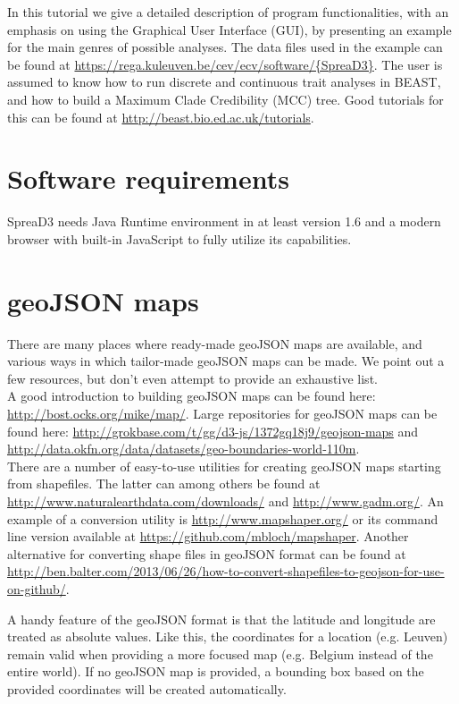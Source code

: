 \documentclass[english]{paper}
\def \spreadname {SpreaD3}
\begin{document}
\par
In this tutorial we give a detailed description of program functionalities, with an emphasis on using the Graphical User Interface (GUI), by presenting an example for the main genres of possible analyses. %
The data files used in the example can be found at  \url{https://rega.kuleuven.be/cev/ecv/software/{\spreadname}}.
The user is assumed to know how to run discrete and continuous trait analyses in BEAST, and how to build a Maximum Clade Credibility (MCC) tree. 
Good tutorials for this can be found at \url{http://beast.bio.ed.ac.uk/tutorials}.

\section{Software requirements}

{\spreadname} needs Java Runtime environment in at least version 1.6 and a modern browser with built-in JavaScript to fully utilize its capabilities.

\section{geoJSON maps}	

There are many places where ready-made geoJSON maps are available, and various ways in which tailor-made geoJSON maps can be made. 
We point out a few resources, but don't even attempt to provide an exhaustive list.
\\
A good introduction to building geoJSON maps can be found here: \url{http://bost.ocks.org/mike/map/}.
Large repositories for geoJSON maps can be found here:
\url{http://grokbase.com/t/gg/d3-js/1372gq18j9/geojson-maps} and \url{http://data.okfn.org/data/datasets/geo-boundaries-world-110m}.
\\
There are a number of easy-to-use utilities for creating geoJSON maps starting from shapefiles. 
The latter can among others be found at \url{http://www.naturalearthdata.com/downloads/} and \url{http://www.gadm.org/}.
An example of a conversion utility is \url{http://www.mapshaper.org/} or its command line version available at \url{https://github.com/mbloch/mapshaper}.
Another alternative for converting shape files in geoJSON format can be found at \url{http://ben.balter.com/2013/06/26/how-to-convert-shapefiles-to-geojson-for-use-on-github/}.
\par
A handy feature of the geoJSON format is that the latitude and longitude are treated as absolute values.
Like this, the coordinates for a location (e.g. Leuven) remain valid when providing a more focused map (e.g. Belgium instead of the entire world).
If no geoJSON map is provided, a bounding box based on the provided coordinates will be created automatically.
\end{document}
